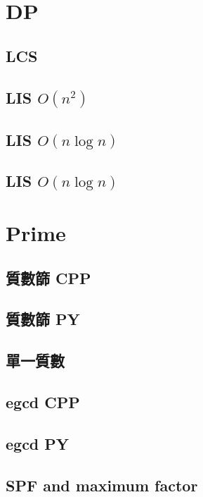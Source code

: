 \section{DP}
    \subsection{LCS}
        
    \subsection{LIS $O(n^2)$}
         
    \subsection{LIS $O(n \log n)$}
        
    \subsection{LIS $O(n \log n)$}
        
\section{Prime}
    \subsection{質數篩 CPP}
        
    \subsection{質數篩 PY}
        
    \subsection{單一質數}
        
    \subsection{egcd CPP}
        
    \subsection{egcd PY}
        
    \subsection{SPF and maximum factor}
        
